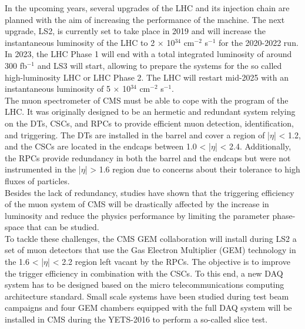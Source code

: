 
In the upcoming years, several upgrades of the LHC and its injection chain are planned with the aim of increasing the performance of the machine. The next upgrade, LS2, is currently set to take place in 2019 and will increase the instantaneous luminosity of the LHC to 2 $ \times $ 10$^{34}$ cm$^{-2}$ s$^{-1}$ for the 2020-2022 run. In 2023, the LHC Phase 1 will end with a total integrated luminosity of around 300 fb$^{-1}$ and LS3 will start, allowing to prepare the systems for the so called high-luminosity LHC or LHC Phase 2. The LHC will restart mid-2025 with an instantaneous luminosity of 5 $ \times $ 10$^{34}$ cm$^{-2}$ s$^{-1}$. \\

The muon spectrometer of CMS must be able to cope with the program of the LHC. It was originally designed to be an hermetic and redundant system relying on the DTs, CSCs, and RPCs to provide efficient muon detection, identification, and triggering. The DTs are installed in the barrel and cover a region of |$\eta$| < 1.2, and the CSCs are located in the endcaps between 1.0 < |$\eta$| < 2.4. Additionally, the RPCs provide redundancy in both the barrel and the endcaps but were not instrumented in the |$\eta$| > 1.6 region due to concerns about their tolerance to high fluxes of particles. \\

Besides the lack of redundancy, studies have shown that the triggering efficiency of the muon system of CMS will be drastically affected by the increase in luminosity and reduce the physics performance by limiting the parameter phase-space that can be studied. \\

To tackle these challenges, the CMS GEM collaboration \cite{Colaleo:2021453} will install during LS2 a set of muon detectors that use the Gas Electron Multiplier (GEM) technology in the 1.6 < |$\eta$| < 2.2 region left vacant by the RPCs. The objective is to improve the trigger efficiency in combination with the CSCs. To this end, a new DAQ system has to be designed based on the micro telecommunications computing architecture standard. Small scale systems have been studied during test beam campaigns and four GEM chambers equipped with the full DAQ system will be installed in CMS during the YETS-2016 to perform a so-called slice test. \\

